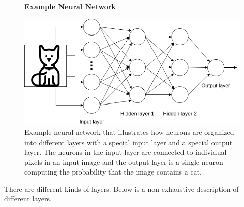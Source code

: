 \begin{figure}
    \centering
    \textbf{Example Neural Network}\par\medskip
    \includegraphics[width=\textwidth]{./pictures/method/example_neural_network.png}
    \caption{Example neural network that illustrates how neurons are organized
        into different layers with a special input layer and a special output
        layer. The neurons in the input layer are connected to individual pixels
        in an input image and the output layer is a single neuron computing the
        probability that the image contains a cat.}
    \label{fig:example_nn}
\end{figure}

There are different kinds of layers. Below is a non-exhaustive description of
different layers.

